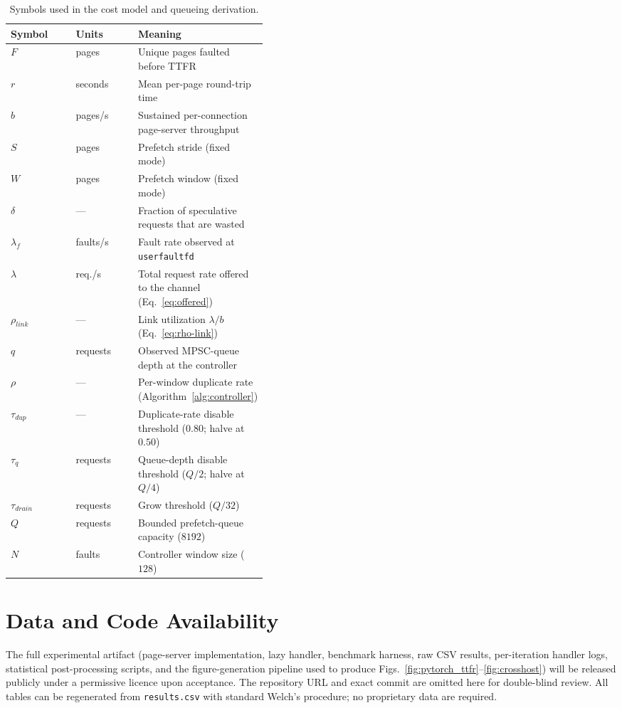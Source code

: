 \documentclass[journal]{IEEEtran}
\newif\ifanon
\newcommand{\uffd}{\texttt{userfaultfd}\xspace}
\newcommand{\dupthr}{\ensuremath{\tau_\textit{dup}}}
\newcommand{\qthr}{\ensuremath{\tau_q}}
\newcommand{\drainthr}{\ensuremath{\tau_\textit{drain}}}
\begin{document}
\begin{table}[ht]
\centering
\caption{Symbols used in the cost model and queueing derivation.}
\label{tab:notation}
\renewcommand{\arraystretch}{1.15}
\begin{tabular}{@{}llp{0.42\linewidth}@{}}
\toprule
\textbf{Symbol} & \textbf{Units} & \textbf{Meaning} \\
\midrule
$F$ & pages & Unique pages faulted before TTFR \\
$r$ & seconds & Mean per-page round-trip time \\
$b$ & pages/s & Sustained per-connection page-server throughput \\
$S$ & pages & Prefetch stride (fixed mode) \\
$W$ & pages & Prefetch window (fixed mode) \\
$\delta$ & --- & Fraction of speculative requests that are wasted \\
$\lambda_f$ & faults/s & Fault rate observed at \uffd \\
$\lambda$ & req./s & Total request rate offered to the channel
            (Eq.~\eqref{eq:offered}) \\
$\rho_{\!\textit{link}}$ & --- & Link utilization $\lambda/b$
            (Eq.~\eqref{eq:rho-link}) \\
$q$ & requests & Observed MPSC-queue depth at the controller \\
$\rho$ & --- & Per-window duplicate rate
            (Algorithm~\ref{alg:controller}) \\
$\dupthr$ & --- & Duplicate-rate disable threshold ($0.80$; halve at $0.50$) \\
$\qthr$ & requests & Queue-depth disable threshold ($Q/2$; halve at $Q/4$) \\
$\drainthr$ & requests & Grow threshold ($Q/32$) \\
$Q$ & requests & Bounded prefetch-queue capacity ($8192$) \\
$N$ & faults & Controller window size ($128$) \\
\bottomrule
\end{tabular}
\end{table}

\ifanon
\section*{Data and Code Availability}

The full experimental artifact (page-server implementation, lazy handler,
benchmark harness, raw CSV results, per-iteration handler logs, statistical
post-processing scripts, and the figure-generation pipeline used to produce
Figs.~\ref{fig:pytorch_ttfr}--\ref{fig:crosshost}) will be released
publicly under a permissive licence upon acceptance. The repository URL and
exact commit are omitted here for double-blind review. All tables can be
regenerated from \texttt{results.csv} with standard Welch's procedure; no
proprietary data are required.
\end{document}
